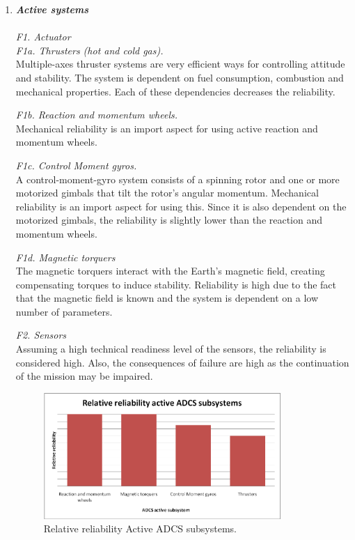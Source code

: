 \begin{enumerate}[A]
	\item  \textbf{\textit{Active systems}} \\\\
\textit{F1. Actuator}\\

\textit{F1a. Thrusters (hot and cold gas).}\\ 
Multiple-axes thruster systems are very efficient ways for controlling attitude and stability. The system is dependent on fuel consumption, combustion and mechanical properties. Each of these dependencies decreases the reliability. 

\textit{F1b. Reaction and momentum wheels.}\\ 
Mechanical reliability is an import aspect for using active reaction and momentum wheels. 

\textit{F1c. Control Moment gyros.}\\ 
A control-moment-gyro system consists of a spinning rotor and one or more motorized gimbals that tilt the rotor's angular momentum. Mechanical reliability is an import aspect for using this. Since it is also dependent on the motorized gimbals, the reliability is slightly lower than the reaction and momentum wheels.

\textit{F1d. Magnetic torquers}\\ 
The magnetic torquers interact with the Earth's magnetic field, creating compensating torques to induce stability. Reliability is high due to the fact that the magnetic field is known and the system is dependent on a low number of parameters.

\textit{F2. Sensors}\\ 
Assuming a high technical readiness level of the sensors, the reliability is considered high. Also, the consequences of failure are high as the continuation of the mission may be impaired.

\begin{figure} [h]
	\begin{center}
 \includegraphics[width=0.85\textwidth,angle=0]{chapters/img/TRA_ADCS_A.png}	
	\caption{Relative reliability Active ADCS subsystems.}
	\label{TRA_ADCS_A}
	\end{center}
\end{figure}


\end{enumerate}
